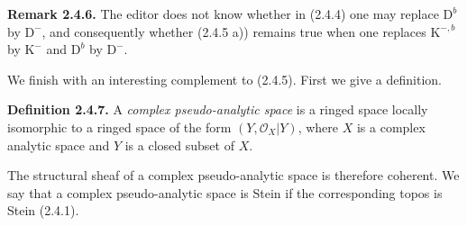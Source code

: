 \documentclass[11pt]{article}
\begin{document}
\textbf{Remark 2.4.6.} The editor does not know whether in (2.4.4) one may replace $\mathrm D^b$ by $\mathrm D^{-}$, and consequently whether (2.4.5 a)) remains true when one replaces $\mathrm K^{-,b}$ by $\mathrm K^{-}$ and $\mathrm D^b$ by $\mathrm D^{-}$.

We finish with an interesting complement to (2.4.5). First we give a definition.

\textbf{Definition 2.4.7.} A \emph{complex pseudo-analytic space} is a ringed space locally isomorphic to a ringed space of the form $(Y,\mathcal O_X|Y)$, where $X$ is a complex analytic space and $Y$ is a closed subset of $X$.

The structural sheaf of a complex pseudo-analytic space is therefore coherent. We say that a complex pseudo-analytic space is Stein if the corresponding topos is Stein (2.4.1).
\end{document}
